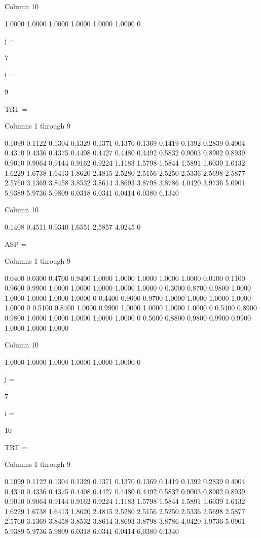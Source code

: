   Column 10

    1.0000
    1.0000
    1.0000
    1.0000
    1.0000
    1.0000
         0


j =

     7


i =

     9


TRT =

  Columns 1 through 9

    0.1099    0.1122    0.1304    0.1329    0.1371    0.1370    0.1369    0.1419    0.1392
    0.2839    0.4004    0.4310    0.4336    0.4375    0.4408    0.4427    0.4480    0.4492
    0.5832    0.9003    0.8902    0.8939    0.9010    0.9064    0.9144    0.9162    0.9224
    1.1183    1.5798    1.5844    1.5891    1.6039    1.6132    1.6229    1.6738    1.6413
    1.8620    2.4815    2.5280    2.5156    2.5250    2.5336    2.5698    2.5877    2.5760
    3.1369    3.8458    3.8532    3.8614    3.8693    3.8798    3.8786    4.0420    3.9736
    5.0901    5.9389    5.9736    5.9809    6.0318    6.0341    6.0414    6.0380    6.1340

  Column 10

    0.1408
    0.4511
    0.9340
    1.6551
    2.5857
    4.0245
         0


ASP =

  Columns 1 through 9

    0.0400    0.0300    0.4700    0.9400    1.0000    1.0000    1.0000    1.0000    1.0000
    0.0100    0.1100    0.9600    0.9900    1.0000    1.0000    1.0000    1.0000    1.0000
         0    0.3000    0.8700    0.9800    1.0000    1.0000    1.0000    1.0000    1.0000
         0    0.4400    0.9000    0.9700    1.0000    1.0000    1.0000    1.0000    1.0000
         0    0.5100    0.8400    1.0000    0.9900    1.0000    1.0000    1.0000    1.0000
         0    0.5400    0.8900    0.9800    1.0000    1.0000    1.0000    1.0000    1.0000
         0    0.5600    0.8800    0.9800    0.9900    0.9900    1.0000    1.0000    1.0000

  Column 10

    1.0000
    1.0000
    1.0000
    1.0000
    1.0000
    1.0000
         0


j =

     7


i =

    10


TRT =

  Columns 1 through 9

    0.1099    0.1122    0.1304    0.1329    0.1371    0.1370    0.1369    0.1419    0.1392
    0.2839    0.4004    0.4310    0.4336    0.4375    0.4408    0.4427    0.4480    0.4492
    0.5832    0.9003    0.8902    0.8939    0.9010    0.9064    0.9144    0.9162    0.9224
    1.1183    1.5798    1.5844    1.5891    1.6039    1.6132    1.6229    1.6738    1.6413
    1.8620    2.4815    2.5280    2.5156    2.5250    2.5336    2.5698    2.5877    2.5760
    3.1369    3.8458    3.8532    3.8614    3.8693    3.8798    3.8786    4.0420    3.9736
    5.0901    5.9389    5.9736    5.9809    6.0318    6.0341    6.0414    6.0380    6.1340

